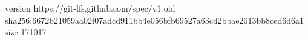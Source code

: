 version https://git-lfs.github.com/spec/v1
oid sha256:6672b21059aa02f07adcd911bb4e056bfb69527a63cd2bbae2013bb8ced6d6a1
size 171017
